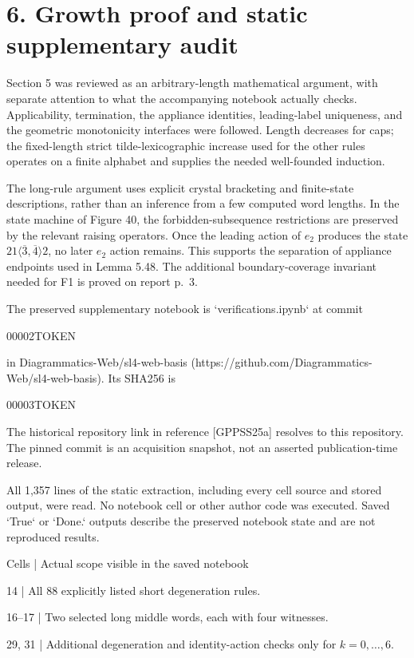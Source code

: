 \documentclass[10pt]{article}
\begin{document}
\section*{6. Growth proof and static supplementary audit}
Section 5 was reviewed as an arbitrary-length mathematical argument, with separate attention to what the accompanying notebook actually checks. Applicability, termination, the appliance identities, leading-label uniqueness, and the geometric monotonicity interfaces were followed. Length decreases for caps; the fixed-length strict tilde-lexicographic increase used for the other rules operates on a finite alphabet and supplies the needed well-founded induction.\par
The long-rule argument uses explicit crystal bracketing and finite-state descriptions, rather than an inference from a few computed word lengths. In the state machine of Figure 40, the forbidden-subsequence restrictions are preserved by the relevant raising operators. Once the leading action of \(e_2\) produces the state \(21\langle\overline3,\overline4\rangle2\), no later \(e_2\) action remains. This supports the separation of appliance endpoints used in Lemma 5.48. The additional boundary-coverage invariant needed for F1 is proved on report p. 3.\par
The preserved supplementary notebook is `verifications.ipynb` at commit\par
00002TOKEN\par
in Diagrammatics-Web/sl4-web-basis (https://github.com/Diagrammatics-Web/sl4-web-basis). Its SHA256 is\par
00003TOKEN\par
The historical repository link in reference [GPPSS25a] resolves to this repository. The pinned commit is an acquisition snapshot, not an asserted publication-time release.\par
All 1,357 lines of the static extraction, including every cell source and stored output, were read. No notebook cell or other author code was executed. Saved `True` or `Done.` outputs describe the preserved notebook state and are not reproduced results.\par
Cells | Actual scope visible in the saved notebook\par
14 | All 88 explicitly listed short degeneration rules.\par
16–17 | Two selected long middle words, each with four witnesses.\par
29, 31 | Additional degeneration and identity-action checks only for \(k=0,\ldots,6\).\par
\end{document}
